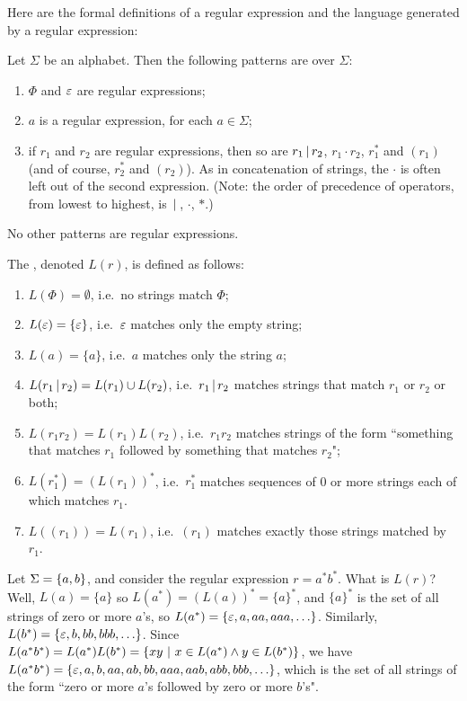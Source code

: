 Here are the formal definitions of a regular expression and the language
generated by a regular expression:

\begin{definition}
Let $\Sigma$ be an alphabet.  Then the 
following patterns are  over $\Sigma$:
\begin{enumerate}
\item $\Phi$ and $\varepsilon$ are regular expressions;
\item $a$ is a regular expression, for each $a \in \Sigma$;
\item if $r_1$ and $r_2$ are regular expressions, then so are
$r_1\hbox{$\,|\,$} r_2$, $r_1\cdot r_2$, $r_1^*$ and $(r_1)$ (and of course, $r_2^*$
and $(r_2)$).
As in concatenation of strings, the $\cdot$ is often left out of
the second expression.  (Note: the order of precedence of operators, from lowest to highest,
is $\hbox{$\,|\,$} $, $\cdot$, $*$.)
\end{enumerate}
No other patterns are regular expressions.
\end{definition}

\begin{definition}\label{lgbre}
The , 
denoted $L(r)$,
is defined as follows:
\begin{enumerate}
\item $L(\Phi) = \emptyset$, i.e.\ no strings match $\Phi$;
\item $L(\varepsilon) = \{\varepsilon\}$, i.e.\ $\varepsilon$ matches only the 
empty string;
\item $L(a) = \{a\}$, i.e.\ $a$ matches only the string $a$;
\item $L(r_1\hbox{$\,|\,$} r_2) = L(r_1) \cup L(r_2)$, i.e.\ $r_1\hbox{$\,|\,$} r_2$ matches
strings that match $r_1$ or $r_2$ or both;
\item $L(r_1r_2) = L(r_1)L(r_2)$, i.e.\ $r_1r_2$ matches strings of the form 
``something that matches $r_1$ followed by something that 
matches $r_2$";
\item $L(r_1^*) = (L(r_1))^*$, i.e.\ $r_1^*$ matches sequences of 0
or more strings each of which matches $r_1$.
\item $L((r_1)) = L(r_1)$, i.e.\ $(r_1)$ matches exactly those strings
matched by $r_1$.
\end{enumerate}
\end{definition}

\begin{example}
Let $\Sigma = \mbox{$\{a,b\}$}$, and consider the regular expression $r=a^*b^*$.  What is
$L(r)$?  Well, $L(a) = \{a\}$ so $L(a^*) = (L(a))^* = \{a\}^*$, and $\{a\}^*$ is
the set of all strings of zero or more $a$'s, so $L(a^*) = \{\varepsilon, a, aa, aaa,
\ldots\}$.  Similarly, $L(b^*) = \{\varepsilon, b, bb, bbb, \ldots\}$.  
Since  $L(a^*b^*) = L(a^*)L(b^*) = \{xy \ | \ x\in L(a^*)\wedge y\in L(b^*)\}$, we
have $L(a^*b^*) = \{\varepsilon, a, b, aa, ab, bb, aaa, aab, abb, bbb, \ldots\}$,
which is the set of all strings of the form ``zero or more $a$'s followed by zero
or more $b$'s".
\end{example}

